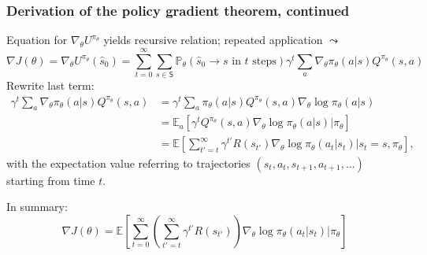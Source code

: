 \documentclass[t]{beamer}
\begin{document}
\begin{frame}
\frametitle{Derivation of the policy gradient theorem, continued}
Equation for $\nabla_{\theta} U^{\pi_{\theta}}$ yields recursive relation; repeated application $\leadsto$
\[
\nabla J(\theta) = \nabla_{\theta} U^{\pi_{\theta}}(\hat{s}_0) = \sum_{t=0}^{\infty} \sum_{s \in \mathsf{S}} \mathbb{P}_{\theta}(\hat{s}_0 \to s \text{ in } t \text{ steps}) \gamma^t \sum_{a} \nabla_{\theta} \pi_{\theta}(a \vert s) Q^{\pi_{\theta}}(s, a)
\]
Rewrite last term:
\[
\begin{split}
\gamma^t \sum_{a} \nabla_{\theta} \pi_{\theta}(a \vert s) Q^{\pi_{\theta}}(s, a)
&= \gamma^t \sum_{a} \pi_{\theta}(a \vert s) Q^{\pi_{\theta}}(s, a) \nabla_{\theta} \log \pi_{\theta}(a \vert s) \\
&= \mathbb{E}_a\!\left[ \gamma^t Q^{\pi_{\theta}}(s, a) \nabla_{\theta} \log \pi_{\theta}(a \vert s) \big\vert \pi_{\theta} \right] \\
&= \mathbb{E}\!\left[ \sum_{t'=t}^{\infty} \gamma^{t'} R(s_{t'}) \nabla_{\theta} \log \pi_{\theta}(a_t \vert s_t) \big\vert s_t = s, \pi_{\theta} \right],
\end{split}
\]
with the expectation value referring to trajectories $(s_t, a_t, s_{t+1}, a_{t+1}, \dots)$ starting from time $t$.

In summary:
\[
\nabla J(\theta) = \mathbb{E}\!\left[ \sum_{t=0}^{\infty} \left(\sum_{t'=t}^{\infty} \gamma^{t'} R(s_{t'})\right) \nabla_{\theta} \log \pi_{\theta}(a_t \vert s_t) \big\vert \pi_{\theta} \right]
\]
\end{frame}
\end{document}
